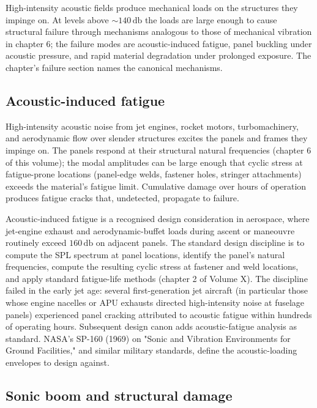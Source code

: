 High-intensity acoustic fields produce mechanical loads on the
structures they impinge on. At levels above $\sim 140\,\si{\decibel}$
the loads are large enough to cause structural failure through
mechanisms analogous to those of mechanical vibration in chapter 6;
the failure modes are acoustic-induced fatigue, panel buckling
under acoustic pressure, and rapid material degradation under
prolonged exposure. The chapter's failure section names the
canonical mechanisms.

\subsection{Acoustic-induced fatigue}

High-intensity acoustic noise from jet engines, rocket motors,
turbomachinery, and aerodynamic flow over slender structures
excites the panels and frames they impinge on. The panels respond
at their structural natural frequencies (chapter 6 of this volume);
the modal amplitudes can be large enough that cyclic stress at
fatigue-prone locations (panel-edge welds, fastener holes, stringer
attachments) exceeds the material's fatigue limit. Cumulative damage
over hours of operation produces fatigue cracks that, undetected,
propagate to failure.

Acoustic-induced fatigue is a recognised design consideration in
aerospace, where jet-engine exhaust and aerodynamic-buffet loads
during ascent or maneouvre routinely exceed $160\,\si{\decibel}$
on adjacent panels. The standard design discipline is to compute
the SPL spectrum at panel locations, identify the panel's natural
frequencies, compute the resulting cyclic stress at fastener and
weld locations, and apply standard fatigue-life methods (chapter 2
of Volume X). The discipline failed in the early jet age: several
first-generation jet aircraft (in particular those whose engine
nacelles or APU exhausts directed high-intensity noise at fuselage
panels) experienced panel cracking attributed to acoustic fatigue
within hundreds of operating hours. Subsequent design canon adds
acoustic-fatigue analysis as standard. NASA's SP-160 (1969) on
"Sonic and Vibration Environments for Ground Facilities," and
similar military standards, define the acoustic-loading envelopes
to design against.

\subsection{Sonic boom and structural damage}

